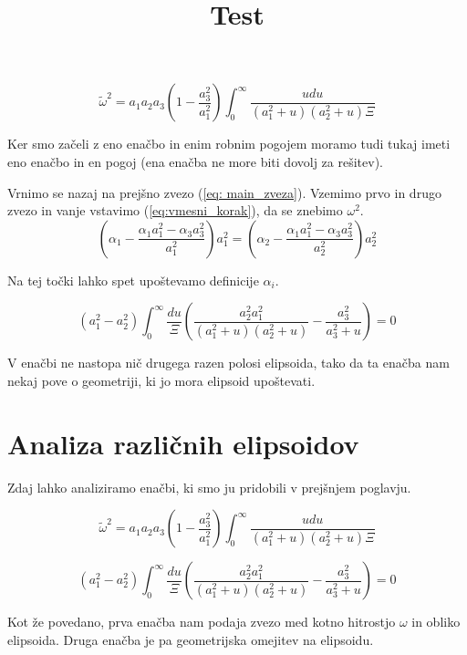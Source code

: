 \documentclass{article}
\theoremstyle{definition}
\theoremstyle{plain}
\numberwithin{definition}{section}
\numberwithin{theorem}{section} \title{Test}
\begin{document}
\begin{equation}
	\tilde{\omega}^2 =
	a_1 a_2 a_3 \left(1-\frac{a_3^2}{a_1^2}\right) \int_0^{\infty} 
	\frac{u du}{(a_1^2 + u)(a_2^2 + u)\Xi}
	\label{eq:1_koncna}
\end{equation}

Ker smo začeli z eno enačbo in enim robnim pogojem moramo tudi tukaj imeti 
eno enačbo in en pogoj (ena enačba ne more biti dovolj za rešitev).

Vrnimo se nazaj na prejšno zvezo (\ref{eq: main_zveza}). 
Vzemimo prvo in drugo zvezo in vanje vstavimo (\ref{eq:vmesni_korak}), 
da se znebimo $\omega^2$.
\begin{equation}
	\left(\alpha_1 - \frac{\alpha_1 a_1^2 - \alpha_3 a_3^2}{a_1^2}\right)a_1^2 = 
	\left(\alpha_2 - \frac{\alpha_1 a_1^2 - \alpha_3 a_3^2}{a_2^2}\right)a_2^2  
	\label{eq:vmesni_korak_2}
\end{equation}

Na tej točki lahko spet upoštevamo definicije $\alpha_i$.

\begin{equation}
	(a_1^2 - a_2^2) \int_0^{\infty} \frac{du}{\Xi}
	\left( \frac{a_2^2 a_1^2}{(a_1^2 + u)(a_2^2 + u)} - 
	\frac{a_3^2}{a_3^2 + u} \right) = 0
	\label{eq:2_koncna}
\end{equation}

V enačbi ne nastopa nič drugega razen polosi elipsoida, tako da ta enačba nam 
nekaj pove o geometriji, ki jo mora elipsoid upoštevati.

\section{Analiza različnih elipsoidov}
Zdaj lahko analiziramo enačbi, ki smo ju pridobili v prejšnjem poglavju.

\begin{equation}
	\tilde{\omega}^2 = 
	a_1 a_2 a_3 \left(1-\frac{a_3^2}{a_1^2}\right) \int_0^{\infty} 
	\frac{u du}{(a_1^2 + u)(a_2^2 + u)\Xi}
\end{equation}

\begin{equation}
	(a_1^2 - a_2^2) \int_0^{\infty} \frac{du}{\Xi}
	\left( \frac{a_2^2 a_1^2}{(a_1^2 + u)(a_2^2 + u)} - 
	\frac{a_3^2}{a_3^2 + u} \right) = 0
\end{equation}

Kot že povedano, prva enačba nam podaja zvezo med kotno hitrostjo $\omega$
in obliko elipsoida. Druga enačba je pa geometrijska omejitev na elipsoidu.
\end{document}
